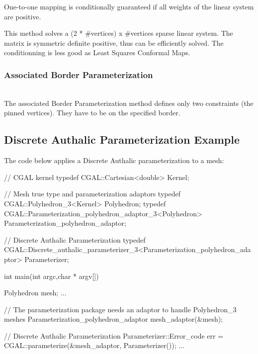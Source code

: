 One-to-one mapping is conditionally guaranteed if all weights
of the linear system are positive.

This method solves a (2 * \#vertices) x \#vertices sparse linear system.
The matrix is symmetric definite positive, thus can be
efficiently solved. The conditionning is less good as Least Squares Conformal Maps.


\subsubsection{Associated Border Parameterization}

  \\

The associated Border Parameterization method defines only two constraints
(the pinned vertices). They have to be on the specified border.


\subsection{Discrete Authalic Parameterization Example}

The code below applies a Discrete Authalic parameterization to a  mesh:

\begin{ccExampleCode}

// CGAL kernel
typedef CGAL::Cartesian<double>                         Kernel;

// Mesh true type and parameterization adaptors
typedef CGAL::Polyhedron_3<Kernel>                      Polyhedron;
typedef CGAL::Parameterization_polyhedron_adaptor_3<Polyhedron>
                                                        Parameterization_polyhedron_adaptor;

// Discrete Authalic Parameterization
typedef CGAL::Discrete_authalic_parameterizer_3<Parameterization_polyhedron_adaptor>
                                                        Parameterizer;

int main(int argc,char * argv[])
{
    Polyhedron mesh;
    ...

    // The parameterization package needs an adaptor to handle Polyhedron_3 meshes
    Parameterization_polyhedron_adaptor mesh_adaptor(&mesh);

    // Discrete Authalic Parameterization
    Parameterizer::Error_code err = CGAL::parameterize(&mesh_adaptor, Parameterizer());
    ...
}

\end{ccExampleCode}

